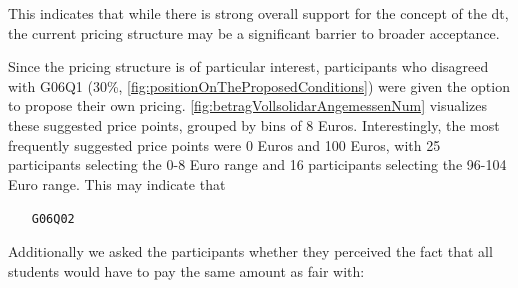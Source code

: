 This indicates that while there is strong overall support for the concept of the \acrshort{dt}, the current pricing structure may be a significant barrier to broader acceptance.

\clearpage

Since the pricing structure is of particular interest, participants who disagreed with G06Q1 (30\%, \ref{fig:positionOnTheProposedConditions}) were given the option to propose their own pricing. \ref{fig:betragVollsolidarAngemessenNum} visualizes these suggested price points, grouped by bins of 8 Euros. Interestingly, the most frequently suggested price points were 0 Euros and 100 Euros, with 25 participants selecting the 0-8 Euro range and 16 participants selecting the 96-104 Euro range. This may indicate that 

\begin{enumerate}
    \item[\texttt{G06Q02}] 
\end{enumerate}

Additionally we asked the participants whether they perceived the fact that all students would have to pay the same amount as fair with:

